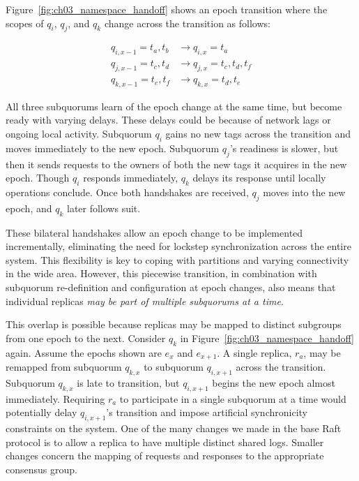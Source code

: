 Figure~\ref{fig:ch03_namespace_handoff} shows an epoch transition where the scopes of $q_i$, $q_j$, and $q_k$ change across the transition as follows:


\renewcommand{\baselinestretch}{1}
\begin{eqnarray}
    q_{i,x-1} = t_a, t_b  &\longrightarrow q_{i,x} = t_a\\
    q_{j,x-1} = t_c, t_d  &\longrightarrow q_{j,x} = t_c,t_d,t_f\\
    q_{k,x-1} = t_e, t_f  &\longrightarrow q_{k,x} = t_d,t_e
\end{eqnarray}
\renewcommand{\baselinestretch}{2}

All three subquorums learn of the epoch change at the same time, but become ready with varying delays.
These delays could be because of network lags or ongoing local activity.
Subquorum $q_i$ gains no new tags across the transition and moves immediately to the new epoch.
Subquorum $q_j$'s readiness is slower, but then it sends requests to the owners of both the new tags it acquires in the new epoch.
Though $q_i$ responds immediately, $q_k$ delays its response until locally operations conclude.
Once both handshakes are received, $q_j$ moves into the new epoch, and $q_k$ later follows suit.

These bilateral handshakes allow an epoch change to be implemented incrementally, eliminating the need for lockstep synchronization across the entire system.
This flexibility is key to coping with partitions and varying connectivity in the wide area.
However, this piecewise transition, in combination with subquorum re-definition and configuration at epoch changes, also means that individual replicas \emph{may be part of multiple subquorums at a time}.

This overlap is possible because replicas may be mapped to distinct subgroups from one epoch to the next.
Consider $q_k$ in Figure~\ref{fig:ch03_namespace_handoff} again.
Assume the epochs shown are $e_x$ and $e_{x+1}$.
A single replica, $r_a$, may be remapped from subquorum $q_{k,x}$ to subquorum $q_{i,x+1}$ across the transition.
Subquorum $q_{k,x}$ is late to transition, but $q_{i,x+1}$ begins the new epoch almost immediately.
Requiring $r_a$ to participate in a single subquorum at a time would potentially delay $q_{i,x+1}$'s transition and impose artificial synchronicity constraints on the system.
One of the many changes we made in the base Raft protocol is to allow a replica to have multiple distinct shared logs.
Smaller changes concern the mapping of requests and responses to the appropriate consensus group.

